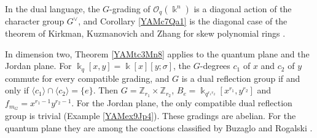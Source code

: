 \documentclass[reqno]{amsart}
\numberwithin{equation}{section}
\theoremstyle{definition}
\theoremstyle{remark}
\theoremstyle{plain}
\newcommand{\kk}{\Bbbk}
\begin{document}
In the dual language, the $G$-grading of $\mathcal O_q(\kk^n)$ is a diagonal action of the character group $G^\vee$, and Corollary \ref{YAMc7Qa1} is the diagonal case of the theorem of Kirkman, Kuzmanovich and Zhang for skew polynomial rings \cite[Theorem 4.5]{KKZ0}.

In dimension two, Theorem \ref{YAMtc3Mn8} applies to the quantum plane and the Jordan plane. For $\kk_q[x,y]=\kk[x][y;\sigma]$, the $G$-degrees $c_1$ of $x$ and $c_2$ of $y$ commute for every compatible grading, and $G$ is a dual reflection group if and only if $\langle c_1\rangle\cap\langle c_2\rangle=\{e\}$. Then $G=\mathbb Z_{r_1}\times\mathbb Z_{r_2}$, $B_e=\kk_{q^{r_1r_2}}[x^{r_1},y^{r_2}]$ and $f_{m_G}=x^{r_1-1}y^{r_2-1}$. For the Jordan plane, the only compatible dual reflection group is trivial (Example \ref{YAMex9Jp4}). These gradings are abelian. For the quantum plane they are among the coactions classified by Buzaglo and Rogalski \cite[Theorem 1.2]{BR2}.
\end{document}
